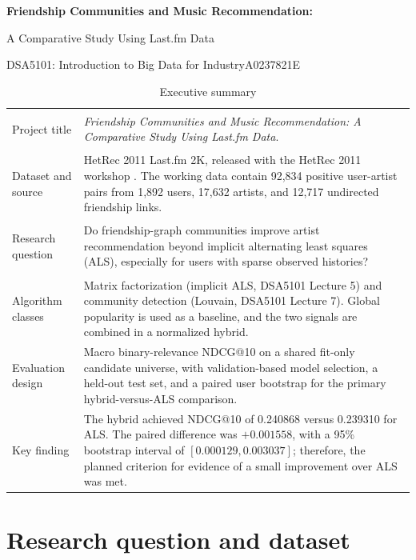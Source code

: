 \documentclass[10pt,a4paper]{article}
\begin{document}
\begin{center}
{\Large\bfseries Friendship Communities and Music Recommendation:\par}
\vspace{2pt}
{\large A Comparative Study Using Last.fm Data\par}
\vspace{4pt}
{\normalsize DSA5101: Introduction to Big Data for Industry\enspace\textbar\enspace A0237821E\par}
\end{center}
\vspace{2pt}

\begin{table}[h]
\centering
\caption*{Executive summary}
\begin{tabularx}{\textwidth}{>{\bfseries\raggedright\arraybackslash}p{2.75cm}Y}
\toprule
Project title & \emph{Friendship Communities and Music Recommendation: A Comparative Study Using Last.fm Data}. \\
Dataset and source & HetRec 2011 Last.fm 2K, released with the HetRec 2011 workshop \cite{cantador2011}. The working data contain 92,834 positive user-artist pairs from 1,892 users, 17,632 artists, and 12,717 undirected friendship links. \\
Research question & Do friendship-graph communities improve artist recommendation beyond implicit alternating least squares (ALS), especially for users with sparse observed histories? \\
Algorithm classes & Matrix factorization (implicit ALS, DSA5101 Lecture 5) and community detection (Louvain, DSA5101 Lecture 7). Global popularity is used as a baseline, and the two signals are combined in a normalized hybrid. \\
Evaluation design & Macro binary-relevance NDCG@10 on a shared fit-only candidate universe, with validation-based model selection, a held-out test set, and a paired user bootstrap for the primary hybrid-versus-ALS comparison. \\
Key finding & The hybrid achieved NDCG@10 of 0.240868 versus 0.239310 for ALS. The paired difference was $+0.001558$, with a 95\% bootstrap interval of $[0.000129,0.003037]$; therefore, the planned criterion for evidence of a small improvement over ALS was met. \\
\bottomrule
\end{tabularx}
\end{table}

\section{Research question and dataset}
\end{document}
